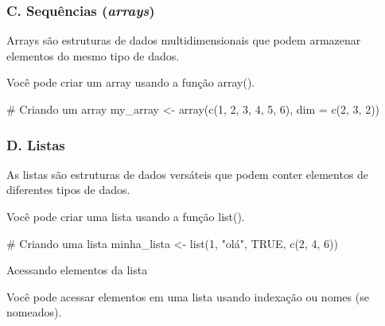 \documentclass[
  letterpaper,
  DIV=11,
  numbers=noendperiod]{scrartcl}
\newenvironment{Shaded}{\begin{snugshade}}{\end{snugshade}}
\newcommand{\AttributeTok}[1]{\textcolor[rgb]{0.40,0.45,0.13}{#1}}
\newcommand{\CommentTok}[1]{\textcolor[rgb]{0.37,0.37,0.37}{#1}}
\newcommand{\ConstantTok}[1]{\textcolor[rgb]{0.56,0.35,0.01}{#1}}
\newcommand{\DecValTok}[1]{\textcolor[rgb]{0.68,0.00,0.00}{#1}}
\newcommand{\FunctionTok}[1]{\textcolor[rgb]{0.28,0.35,0.67}{#1}}
\newcommand{\NormalTok}[1]{\textcolor[rgb]{0.00,0.23,0.31}{#1}}
\newcommand{\OtherTok}[1]{\textcolor[rgb]{0.00,0.23,0.31}{#1}}
\newcommand{\StringTok}[1]{\textcolor[rgb]{0.13,0.47,0.30}{#1}}
\begin{document}
\hypertarget{c.-sequuxeancias-arrays}{%
\subsubsection{\texorpdfstring{C. Sequências
(\emph{arrays})}{C. Sequências (arrays)}}\label{c.-sequuxeancias-arrays}}

Arrays são estruturas de dados multidimensionais que podem armazenar
elementos do mesmo tipo de dados.

Você pode criar um array usando a função array().

\begin{Shaded}
\begin{Highlighting}[]
\CommentTok{\# Criando um array}
\NormalTok{my\_array }\OtherTok{\textless{}{-}} \FunctionTok{array}\NormalTok{(}\FunctionTok{c}\NormalTok{(}\DecValTok{1}\NormalTok{, }\DecValTok{2}\NormalTok{, }\DecValTok{3}\NormalTok{, }\DecValTok{4}\NormalTok{, }\DecValTok{5}\NormalTok{, }\DecValTok{6}\NormalTok{), }\AttributeTok{dim =} \FunctionTok{c}\NormalTok{(}\DecValTok{2}\NormalTok{, }\DecValTok{3}\NormalTok{, }\DecValTok{2}\NormalTok{))}
\end{Highlighting}
\end{Shaded}

\hypertarget{d.-listas}{%
\subsubsection{D. Listas}\label{d.-listas}}

As listas são estruturas de dados versáteis que podem conter elementos
de diferentes tipos de dados.

Você pode criar uma lista usando a função list().

\begin{Shaded}
\begin{Highlighting}[]
\CommentTok{\# Criando uma lista}
\NormalTok{minha\_lista }\OtherTok{\textless{}{-}} \FunctionTok{list}\NormalTok{(}\DecValTok{1}\NormalTok{, }\StringTok{"olá"}\NormalTok{, }\ConstantTok{TRUE}\NormalTok{, }\FunctionTok{c}\NormalTok{(}\DecValTok{2}\NormalTok{, }\DecValTok{4}\NormalTok{, }\DecValTok{6}\NormalTok{))}
\end{Highlighting}
\end{Shaded}

Acessando elementos da lista

Você pode acessar elementos em uma lista usando indexação ou nomes (se
nomeados).
\end{document}
